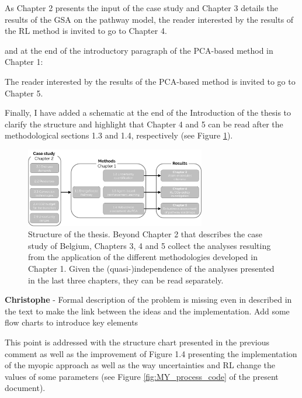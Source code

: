 \documentclass[12pt,a4paper]{article}
\begin{document}
\begin{mdframed}[style=manuscript] %
As Chapter 2 presents the input of the case study and Chapter 3 details the results of the GSA on the pathway model, the reader interested by the results of the RL method is invited to go to Chapter 4.
\end{mdframed}

\noindent and {\color{blue}at the end of the introductory paragraph of the PCA-based method in Chapter 1}:

\begin{mdframed}[style=manuscript] %
The reader interested by the results of the PCA-based method is invited to go to Chapter 5.
\end{mdframed}

\noindent Finally, I have added a schematic at the end of the Introduction of the thesis to clarify the structure and highlight that Chapter 4 and 5 can be read after the methodological sections 1.3 and 1.4, respectively (see Figure \ref{fig:intro:Thesis_Structure}).

\begin{figure}[htbp!]
\centering
\includegraphics[width=0.7\textwidth]{Thesis_Structure.pdf}
\caption{Structure of the thesis. Beyond Chapter 2 that describes the case study of Belgium, Chapters 3, 4 and 5 collect the analyses resulting from the application of the different methodologies developed in Chapter 1. Given the (quasi-)independence of the analyses presented in the last three chapters, they can be read separately.}
\label{fig:intro:Thesis_Structure}
\end{figure}


\begin{mdframed}[style=comment] %
{\color{violet} \textbf{Christophe}} - Formal description of the problem is missing even in described in the text to make the link between the ideas and the implementation. Add some flow charts to introduce key elements
\end{mdframed}

\noindent This point is addressed with the structure chart presented in the previous comment as well as the improvement of Figure 1.4 presenting the implementation of the myopic approach as well as the way uncertainties and RL change the values of some parameters (see Figure \ref{fig:MY_process_code} of the present document).
\end{document}
